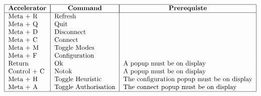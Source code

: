 \[\begin{tabular} {|l|l|l|}
\hline
	\multicolumn{1}{|c|}{\bf Accelerator} & 
		\multicolumn{1}{|c|}{\bf Command} &
			\multicolumn{1}{|c|}{\bf Prerequiste} \\
\hline
	Meta + R & Refresh &\\
	Meta + Q & Quit &\\
	Meta + D & Disconnect &\\
	Meta + C & Connect &\\
	Meta + M & Toggle Modes &\\
	Meta + F & Configuration &\\
	Return & Ok & A popup must be on display\\
	Control + C & Notok & A popup must be on display \\
	Meta + H & Toggle Heuristic & The configuration popup must be on display \\
	Meta + A & Toggle Authorisation & The connect popup must be on display \\
\hline
\end{tabular}\]
